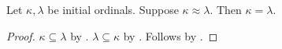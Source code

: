 \begin{proposition}\label{equinumerous_initial_ordinals_are_equal}
    Let $\kappa,\lambda$ be initial ordinals.
    Suppose $\kappa\approx\lambda$.
    Then $\kappa=\lambda$.
\end{proposition}
\begin{proof}
    $\kappa\subseteq\lambda$
        by .
    $\lambda\subseteq\kappa$
        by .
    Follows by .
\end{proof}
